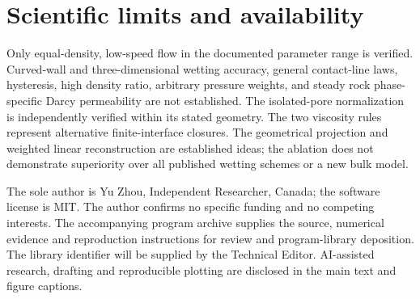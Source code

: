 \documentclass[11pt]{article}
\begin{document}



\section{Scientific limits and availability}
Only equal-density, low-speed flow in the documented parameter range is
verified. Curved-wall and three-dimensional wetting accuracy, general contact-line
laws, hysteresis, high density ratio, arbitrary pressure weights, and
steady rock phase-specific Darcy permeability are not established. The
isolated-pore normalization is independently verified within its stated geometry. The two viscosity
rules represent alternative finite-interface closures. The geometrical
projection and weighted linear reconstruction are established ideas;
the ablation does not demonstrate superiority over all published wetting
schemes or a new bulk model.

The sole author is Yu Zhou, Independent Researcher, Canada; the software
license is MIT. The author confirms no specific funding and no competing
interests. The accompanying program archive supplies the source, numerical
evidence and reproduction instructions for review and program-library
deposition. The library identifier will be supplied by the Technical Editor.
AI-assisted research, drafting and reproducible plotting are disclosed
in the main text and figure captions.


\end{document}
